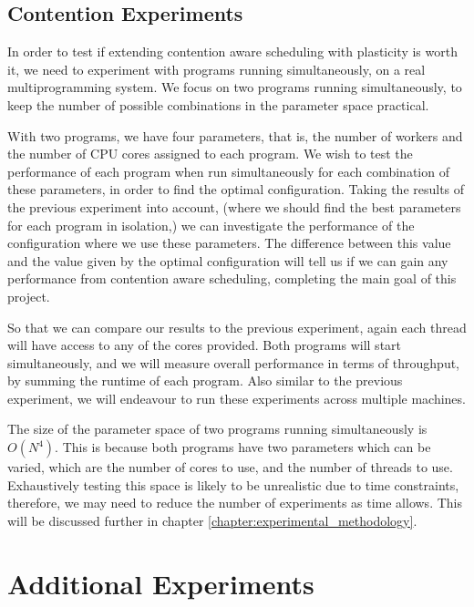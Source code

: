 \subsection{Contention Experiments}
\label{section:design:contention_experiments}

In order to test if extending contention aware scheduling with plasticity is worth it, we need to experiment with programs running simultaneously, on a real multiprogramming system. We focus on two programs running simultaneously, to keep the number of possible combinations in the parameter space practical. 

With two programs, we have four parameters, that is, the number of workers and the number of CPU cores assigned to each program. We wish to test the performance of each program when run simultaneously for each combination of these parameters, in order to find the optimal configuration. Taking the results of the previous experiment into account, (where we should find the best parameters for each program in isolation,) we can investigate the performance of the configuration where we use these parameters. The difference between this value and the value given by the optimal configuration will tell us if we can gain any performance from contention aware scheduling, completing the main goal of this project.

So that we can compare our results to the previous experiment, again each thread will have access to any of the cores provided. Both programs will start simultaneously, and we will measure overall performance in terms of throughput, by summing the runtime of each program. Also similar to the previous experiment, we will endeavour to run these experiments across multiple machines.

The size of the parameter space of two programs running simultaneously is $O(N^4)$. This is because both programs have two parameters which can be varied, which are the number of cores to use, and the number of threads to use. Exhaustively testing this space is likely to be unrealistic due to time constraints, therefore, we may need to reduce the number of experiments as time allows. This will be discussed further in chapter \ref{chapter:experimental_methodology}.



\section{Additional Experiments}
\label{section:design:additional_experiments}

